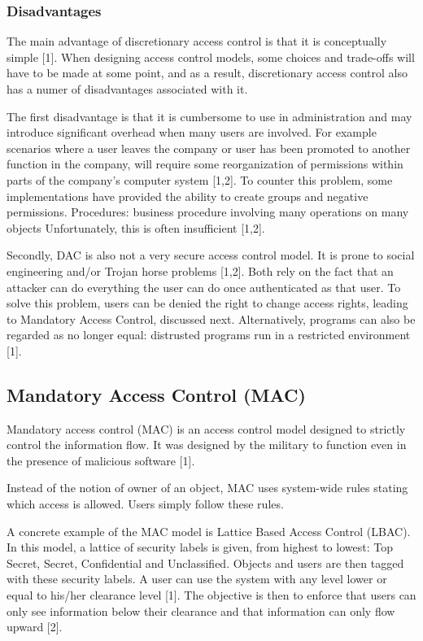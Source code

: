 \subsubsection{Disadvantages}

The main advantage of discretionary access control is that it is conceptually simple [1]. When designing access control models, some choices and trade-offs will have to be made at some point, and as a result, discretionary access control also has a numer of disadvantages associated with it.

The first disadvantage is that it is cumbersome to use in administration and may introduce significant overhead when many users are involved. For example scenarios where a user leaves the company or user has been promoted to another function in the company, will require some reorganization of permissions within parts of the company's computer system [1,2]. To counter this problem, some implementations have provided the ability to create groups and negative permissions. Procedures: business procedure involving many operations on many objects Unfortunately, this is often insufficient [1,2].

Secondly, DAC is also not a very secure access control model. It is prone to social engineering and/or Trojan horse problems [1,2]. Both rely on the fact that an attacker can do everything the user can do once authenticated as that user. To solve this problem, users can be denied the right to change access rights, leading to Mandatory Access Control, discussed next. Alternatively, programs can also be regarded as no longer equal: distrusted programs run in a restricted environment [1].



\subsection{Mandatory Access Control (MAC)}

Mandatory access control (MAC) is an access control model designed to strictly control the information flow. It was designed by the military to function even in the presence of malicious software [1].

Instead of the notion of owner of an object, MAC uses system-wide rules stating which access is allowed. Users simply follow these rules.

A concrete example of the MAC model is Lattice Based Access Control (LBAC). In this model, a lattice of security labels is given, from highest to lowest: Top Secret, Secret, Confidential and Unclassified. Objects and users are then tagged with these security labels. A user can use the system with any level lower or equal to his/her clearance level [1]. The objective is then to enforce that users can only see information below their clearance and that information can only flow upward [2].

